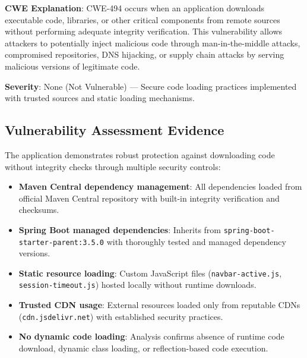\documentclass[]{UCD_CS_FYP_Report}
\begin{document}
\textbf{CWE Explanation}: CWE-494 occurs when an application downloads executable code, libraries, or other critical components from remote sources without performing adequate integrity verification. This vulnerability allows attackers to potentially inject malicious code through man-in-the-middle attacks, compromised repositories, DNS hijacking, or supply chain attacks by serving malicious versions of legitimate code.

\textbf{Severity}: None (Not Vulnerable) — Secure code loading practices implemented with trusted sources and static loading mechanisms.

\subsection{Vulnerability Assessment Evidence}
The application demonstrates robust protection against downloading code without integrity checks through multiple security controls:
\begin{itemize}
	\item \textbf{Maven Central dependency management}: All dependencies loaded from official Maven Central repository with built-in integrity verification and checksums.
	\item \textbf{Spring Boot managed dependencies}: Inherits from \texttt{spring-boot-starter-parent:3.5.0} with thoroughly tested and managed dependency versions.
	\item \textbf{Static resource loading}: Custom JavaScript files (\texttt{navbar-active.js}, \texttt{session-timeout.js}) hosted locally without runtime downloads.
	\item \textbf{Trusted CDN usage}: External resources loaded only from reputable CDNs (\texttt{cdn.jsdelivr.net}) with established security practices.
	\item \textbf{No dynamic code loading}: Analysis confirms absence of runtime code download, dynamic class loading, or reflection-based code execution.
\end{itemize}
\end{document}
